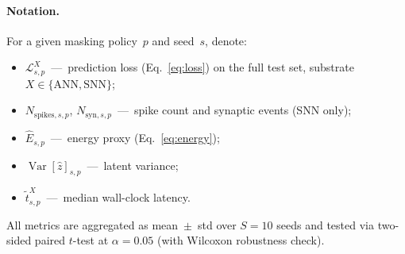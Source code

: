 \documentclass[11pt,a4paper]{article}
\begin{document}
\paragraph{Notation.}
For a given masking policy~$p$ and seed~$s$, denote:
\begin{itemize}[nosep]
\item $\mathcal{L}_{s,p}^{X}$~---~prediction loss
  (Eq.~\ref{eq:loss}) on the full test set, substrate
  $X \in \{\text{ANN}, \text{SNN}\}$;
\item $N_{\text{spikes},s,p}$,
  $N_{\text{syn},s,p}$~---~spike count and synaptic events
  (SNN only);
\item $\hat{E}_{s,p}$~---~energy proxy
  (Eq.~\ref{eq:energy});
\item $\operatorname{Var}[\hat{z}]_{s,p}$~---~latent variance;
\item $\tilde{t}_{s,p}^{X}$~---~median wall-clock latency.
\end{itemize}
All metrics are aggregated as mean~$\pm$~std over $S = 10$ seeds
and tested via two-sided paired $t$-test at $\alpha = 0.05$
(with Wilcoxon robustness check).

\end{document}
